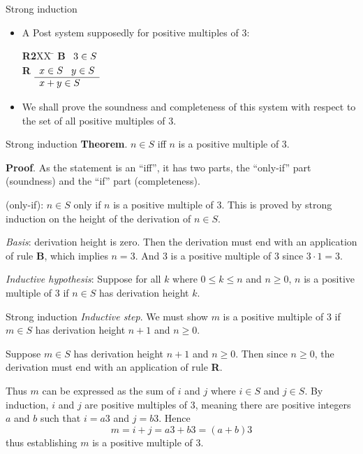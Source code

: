 \documentclass[style=sailor,size=12pt]{powerdot}
\begin{document}
\begin{wideslide}[bm=,toc=]{Strong induction}
\begin{itemize}
\item A Post system supposedly for positive multiples of 3:
\begin{tabbing}
{\bf R2}XX \=  \kill
{\bf B} \>
        \(\begin{array}[t]{l}
        3\in S
        \end{array}\) \\[2ex]
{\bf R} \>
        \(\begin{array}[t]{l}
        x \in S \;\;\;y \in S \\
        \hline
        x + y \in S
        \end{array}\)
\end{tabbing}
\item We shall prove the soundness and completeness of this system with respect to
the set of all positive multiples of 3.
\end{itemize}
\end{wideslide}

\begin{wideslide}[bm=,toc=]{Strong induction}
{\bf Theorem}. $n\in S$ iff $n$ is a positive multiple of 3.
\vspace{1em}

{\bf Proof}.  As the statement is an ``iff'', it has two parts, the ``only-if'' part (soundness)
and the ``if'' part (completeness).

\vspace{1em} 
(only-if): $n\in S$ only if $n$ is a positive multiple of 3.
This is proved by strong induction on the height of the derivation of $n\in S$.

\vspace{1em}
{\em Basis\/}: derivation height is zero.  Then the derivation must end with an
application of rule {\bf B}, which implies $n=3$.
And 3 is a positive multiple of 3 since $3\cdot 1=3$.

\vspace{1em}
{\em Inductive hypothesis\/}:  Suppose for all $k$ where $0\leq k\leq n$ and $n\geq 0$,
$n$ is a positive multiple of 3 if $n\in S$ has derivation height $k$.
\end{wideslide}

\begin{wideslide}[bm=,toc=]{Strong induction}
{\em Inductive step}.
We must show $m$ is a positive multiple of 3 if $m\in S$ has derivation height $n+1$ and $n\geq 0$.

\vspace{1em}
Suppose $m\in S$ has derivation height $n+1$ and $n\geq 0$.
Then since $n\geq 0$, the derivation must end with an application of rule {\bf R}.

\vspace{1em}
Thus $m$ can be expressed as the sum of $i$ and $j$ where $i\in S$ and $j\in S$.
By induction, $i$ and $j$ are positive multiples of 3, meaning there are positive integers
$a$ and $b$ such that $i=a3$ and $j=b3$.
Hence 
\[m = i + j = a3 + b3 = (a+b)3
\]
thus establishing $m$ is a positive multiple of 3.
\end{wideslide}
\end{document}
